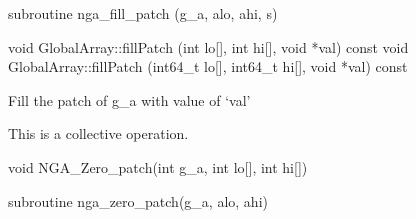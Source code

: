 \documentclass[12pt]{article}
\begin{document}
\begin{fapi}
\begin{fcode}
subroutine nga_fill_patch (g_a, alo, ahi, s)
\end{fcode}
\begin{funcargs}
\end{funcargs}
\end{fapi}

\begin{cxxapi}
\begin{cxxcode}
void GlobalArray::fillPatch (int lo[], int hi[], void *val) const
void GlobalArray::fillPatch (int64_t lo[], int64_t hi[], void *val) const
\end{cxxcode}
\begin{funcargs}
\end{funcargs}
\end{cxxapi}
\gcoll

\begin{desc}

Fill the patch of g_a with value of `val'

This is a collective operation.
\end{desc}


\begin{capi}
\begin{ccode}
void NGA_Zero_patch(int g_a, int lo[], int hi[])
\end{ccode}
\begin{funcargs}
\end{funcargs}
\end{capi}

\begin{fapi}
\begin{fcode}
subroutine nga_zero_patch(g_a, alo, ahi)
\end{fcode}
\begin{funcargs}
\end{funcargs}
\end{fapi}
\end{document}
